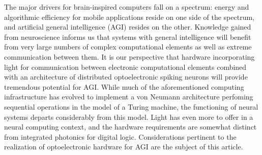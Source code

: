 \documentclass[twocolumn]{article}
\begin{document}
The major drivers for brain-inspired computers fall on a spectrum: energy and algorithmic efficiency for mobile applications reside on one side of the spectrum, and artificial general intelligence (AGI) resides on the other. Knowledge gained from neuroscience informs us that systems with general intelligence will benefit from very large numbers of complex computational elements as well as extreme communication between them. It is our perspective that hardware incorporating light for communication between electronic computational elements combined with an architecture of distributed optoelectronic spiking neurons will provide tremendous potential for AGI. While much of the aforementioned computing infrastructure has evolved to implement a von Neumann architecture perfoming sequential operations in the model of a Turing machine, the functioning of neural systems departs considerably from this model. Light has even more to offer in a neural computing context, and the hardware requirements are somewhat distinct from integrated photonics for digital logic. Considerations pertinent to the realization of optoelectronic hardware for AGI are the subject of this article. 
\end{document}
